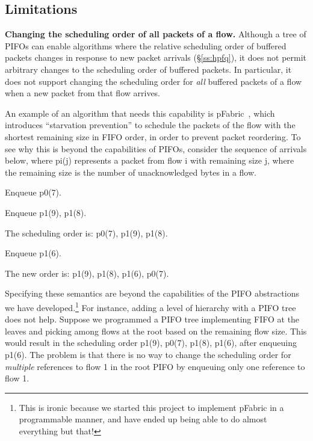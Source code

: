 \subsection{Limitations}
\label{pifo_ss:limitations}

\noindent
\textbf{Changing the scheduling order of all packets of a flow.} 
Although a tree of PIFOs can enable algorithms where the relative scheduling order
of buffered packets changes in response to new packet arrivals (\S\ref{ss:hpfq}), it
does not permit arbitrary changes to the scheduling order of buffered
packets. In particular, it does not support changing the scheduling
order for {\em all} buffered packets of a flow when a new packet from
that flow arrives.

An example of an algorithm that needs this capability is
pFabric~\cite{pFabric}, which introduces ``starvation prevention'' to
schedule the packets of the flow with the shortest remaining size in
FIFO order, in order to prevent packet reordering. To see why this is beyond
the capabilities of PIFOs, consider the sequence of arrivals below,
where pi(j) represents a packet from flow i with remaining size j,
where the remaining size is the number of unacknowledged bytes in a flow.
\begin{CompactEnumerate}
\item Enqueue p0(7).
\item Enqueue p1(9), p1(8).
\item The scheduling order is: p0(7), p1(9), p1(8).
\item Enqueue p1(6).
\item The new order is: p1(9), p1(8), p1(6), p0(7).
\end{CompactEnumerate}

Specifying these semantics are beyond the capabilities of the PIFO
abstractions we have developed.\footnote{This is ironic because we
  started this project to implement pFabric in a programmable manner, and
  have ended up being able to do almost everything but that!} For
instance, adding a level of hierarchy with a PIFO tree does not
help. Suppose we programmed a PIFO tree implementing FIFO at the
leaves and picking among flows at the root based on the remaining flow
size. This would result in the scheduling order p1(9), p0(7), p1(8),
p1(6), after enqueuing p1(6). The problem is that there is no way to
change the scheduling order for {\em multiple} references to flow 1 in the
root PIFO by enqueuing only one reference to flow 1.

